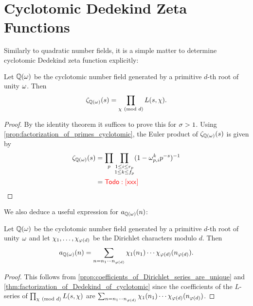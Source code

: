   \section{Cyclotomic Dedekind Zeta Functions}
    Similarly to quadratic number fields, it is a simple matter to determine cyclotomic Dedekind zeta function explicitly:

    \begin{theorem}\label{thm:factorization_of_Dedekind_of_cyclotomic}
      Let $\mathbb{Q}(\omega)$ be the cyclotomic number field generated by a primitive $d$-th root of unity $\omega$. Then
      \[
        \zeta_{\mathbb{Q}(\omega)}(s) = \prod_{\chi \ (\mathrm{mod}\text{ }d)}L(s,\chi).
      \]
    \end{theorem}
    \begin{proof}
      By the identity theorem it suffices to prove this for $\sigma > 1$. Using \cref{prop:factorization_of_primes_cyclotomic}, the Euler product of $\zeta_{\mathbb{Q}(\omega)}(s)$ is given by
      \begin{align*}
        \zeta_{\mathbb{Q}(\omega)}(s) &= \prod_{p}\prod_{\substack{1 \le i \le r_{p} \\ 1 \le k \le f_{p}}}(1-\omega_{p,i}^{k}p^{-s})^{-1} \\
        &= \textcolor{red}{\sf Todo: [xxx]}
      \end{align*}
    \end{proof}

    We also deduce a useful expression for $a_{\mathbb{Q}(\omega)}(n)$:

    \begin{proposition}
      Let $\mathbb{Q}(\omega)$ be the cyclotomic number field generated by a primitive $d$-th root of unity $\omega$ and let $\chi_{1},\ldots,\chi_{\varphi(d)}$ be the Dirichlet characters modulo $d$. Then
      \[
        a_{\mathbb{Q}(\omega)}(n) = \sum_{n = n_{1} \cdots n_{\varphi(d)}}\chi_{1}(n_{1}) \cdots \chi_{\varphi(d)}(n_{\varphi(d)}).
      \]
    \end{proposition}
    \begin{proof}
      This follows from \cref{prop:coefficients_of_Dirichlet_series_are_unique} and \cref{thm:factorization_of_Dedekind_of_cyclotomic} since the coefficients of the $L$-series of $\prod_{\chi \ (\mathrm{mod}\text{ }d)}L(s,\chi)$ are $\sum_{n = n_{1} \cdots n_{\varphi(d)}}\chi_{1}(n_{1}) \cdots \chi_{\varphi(d)}(n_{\varphi(d)})$.
    \end{proof}
